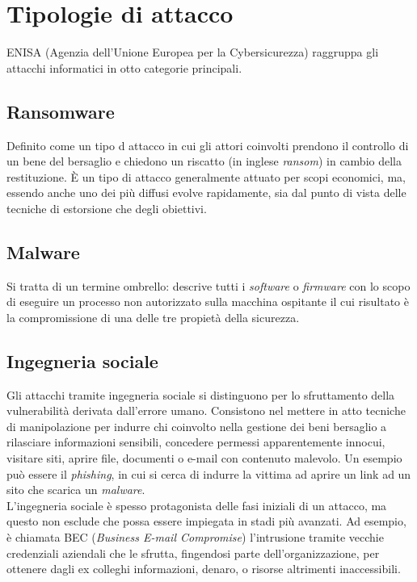 \documentclass[12pt,a4paper,openright,twoside]{report}
\begin{document}
\section{Tipologie di attacco}
ENISA (Agenzia dell'Unione Europea per la Cybersicurezza) raggruppa gli attacchi informatici in otto categorie principali.\cite{enisa_threat_landscape}
\subsection{Ransomware}
Definito come un tipo d attacco in cui gli attori coinvolti prendono il controllo di un bene del bersaglio e chiedono un riscatto (in inglese \textit{ransom}) in cambio della restituzione. \`E un tipo di attacco  generalmente attuato per scopi economici, ma, essendo anche uno dei pi\`u diffusi evolve rapidamente, sia dal punto di vista delle tecniche di estorsione che degli obiettivi.\\

\subsection{Malware}
Si tratta di un termine ombrello: descrive tutti i \textit{software} o \textit{firmware} con lo scopo di eseguire un processo non autorizzato sulla macchina ospitante il cui risultato \`e la compromissione di una delle tre propiet\`a della sicurezza.\\

\subsection{Ingegneria sociale}
Gli attacchi tramite ingegneria sociale si distinguono per lo sfruttamento della vulnerabilit\`a derivata dall'errore umano. Consistono nel mettere in atto tecniche di manipolazione per indurre chi coinvolto nella gestione dei beni bersaglio a rilasciare informazioni sensibili, concedere permessi 
apparentemente innocui, visitare siti, aprire file, documenti o e-mail con contenuto malevolo. Un esempio pu\`o essere il \textit{phishing}, in cui si cerca di indurre la vittima ad aprire un link ad un sito che scarica un \textit{malware}.\\
L'ingegneria sociale \`e spesso protagonista delle fasi iniziali di un attacco, ma questo non esclude che possa essere impiegata in stadi pi\`u avanzati. Ad esempio, \`e chiamata BEC (\textit{Business E-mail Compromise}) l'intrusione tramite vecchie credenziali aziendali che le sfrutta, fingendosi parte dell'organizzazione, per ottenere dagli ex colleghi informazioni, denaro, o risorse altrimenti inaccessibili.\cite{IBM_BEC}\\
\end{document}

